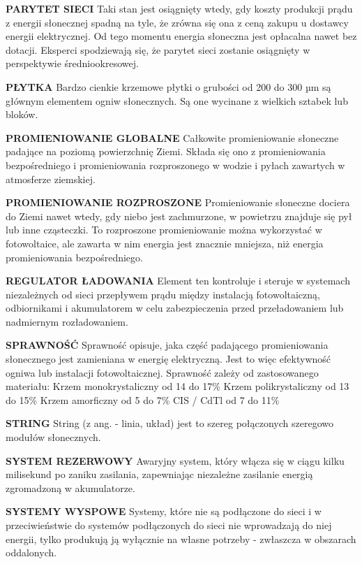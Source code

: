 \documentclass[12pt,a4paper]{article}
\begin{document}
\textbf{PARYTET SIECI}
Taki stan jest osiągnięty wtedy, gdy koszty produkcji prądu z energii słonecznej spadną na tyle, że zrówna się ona z ceną zakupu u dostawcy energii elektrycznej. Od tego momentu energia słoneczna jest opłacalna nawet bez dotacji. Eksperci spodziewają się, że parytet sieci zostanie osiągnięty w perspektywie średniookresowej.


\textbf{PŁYTKA}
Bardzo cienkie krzemowe płytki o grubości od 200 do 300 µm są głównym elementem ogniw słonecznych. Są one wycinane z wielkich sztabek lub bloków.


\textbf{PROMIENIOWANIE GLOBALNE}
Całkowite promieniowanie słoneczne padające na poziomą powierzchnię Ziemi. Składa się ono z promieniowania bezpośredniego i promieniowania rozproszonego w wodzie i pyłach zawartych w atmosferze ziemskiej.


\textbf{PROMIENIOWANIE ROZPROSZONE}
Promieniowanie słoneczne dociera do Ziemi nawet wtedy, gdy niebo jest zachmurzone, w powietrzu znajduje się pył lub inne cząsteczki. To rozproszone promieniowanie można wykorzystać w fotowoltaice, ale zawarta w nim energia jest znacznie mniejsza, niż energia promieniowania bezpośredniego.


\textbf{REGULATOR ŁADOWANIA}
Element ten kontroluje i steruje w systemach niezależnych od sieci przepływem prądu między instalacją fotowoltaiczną, odbiornikami i akumulatorem w celu zabezpieczenia przed przeładowaniem lub nadmiernym rozładowaniem.


\textbf{SPRAWNOŚĆ}
Sprawność opisuje, jaka część padającego promieniowania słonecznego jest zamieniana w energię elektryczną. Jest to więc efektywność ogniwa lub instalacji fotowoltaicznej. Sprawność zależy od zastosowanego materiału:
Krzem monokrystaliczny	od 14 do 17\%
Krzem polikrystaliczny	od 13 do 15\%
Krzem amorficzny	od 5 do 7\%
CIS / CdTl	od 7 do 11\%


\textbf{STRING}
String (z ang. - linia, układ) jest to szereg połączonych szeregowo modułów słonecznych.


\textbf{SYSTEM REZERWOWY}
Awaryjny system, który włącza się w ciągu kilku milisekund po zaniku zasilania, zapewniając niezależne zasilanie energią zgromadzoną w akumulatorze.


\textbf{SYSTEMY WYSPOWE}
Systemy, które nie są podłączone do sieci i w przeciwieństwie do systemów podłączonych do sieci nie wprowadzają do niej energii, tylko produkują ją wyłącznie na własne potrzeby - zwłaszcza w obszarach oddalonych.
\end{document}
